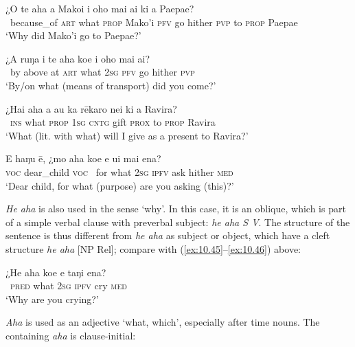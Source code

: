 \ea\label{ex:10.47}
\gll ¿{\ꞌ}O te aha a Mako{\ꞌ}i i oho mai ai ki a Paepae? \\
~because\_of \textsc{art} what \textsc{prop} Mako’i \textsc{pfv} go hither \textsc{pvp} to \textsc{prop} Paepae \\

\glt 
‘Why did Mako’i go to Paepae?’ \textstyleExampleref{[R615.699]} 
\z

\ea\label{ex:10.48}
\gll ¿A ruŋa i te aha koe i oho mai ai? \\
~by above at \textsc{art} what \textsc{2sg} \textsc{pfv} go hither \textsc{pvp} \\

\glt 
‘By/on what (means of transport) did you come?’ \textstyleExampleref{[R245.178]} 
\z

\ea\label{ex:10.49}
\gll ¿Hai aha a au ka rēkaro nei ki a Ravira? \\
~\textsc{ins} what \textsc{prop} \textsc{1sg} \textsc{cntg} gift \textsc{prox} to \textsc{prop} Ravira \\

\glt 
‘What (lit. with what) will I give as a present to Ravira?’ \textstyleExampleref{[R175.002]} 
\z

\ea\label{ex:10.50}
\gll E haŋu ē, ¿mo aha koe e {\ꞌ}ui mai ena? \\
\textsc{voc} dear\_child \textsc{voc} ~for what \textsc{2sg} \textsc{ipfv} ask hither \textsc{med} \\

\glt 
‘Dear child, for what (purpose) are you asking (this)?’ \textstyleExampleref{[R250.114]} 
\z

\textit{He aha} is also used in the sense ‘why’. In this case, it is an oblique, which is part of a simple verbal clause with preverbal subject: \textit{he aha S V}. The structure of the sentence is thus different from \textit{he aha} as subject or object, which have a cleft structure \textit{he aha} [NP Rel]; compare  with (\ref{ex:10.45}–\ref{ex:10.46}) above: 

\ea\label{ex:10.51}
\gll ¿He aha koe e taŋi ena? \\
~\textsc{pred} what \textsc{2sg} \textsc{ipfv} cry \textsc{med} \\

\glt 
‘Why are you crying?’ \textstyleExampleref{[Ley-9-55.064]}
\z

\textit{Aha} is used as an adjective ‘what, which’, especially after time nouns. The  containing \textit{aha} is clause-initial:

